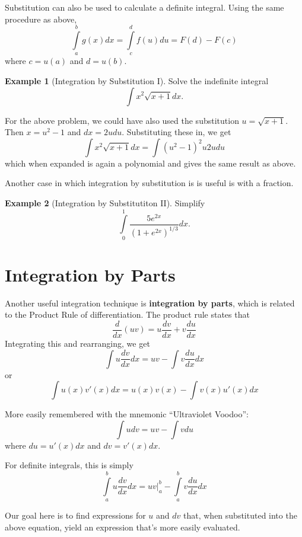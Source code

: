 \documentclass[
]{book}
\theoremstyle{definition}
\theoremstyle{definition}
\newtheorem{example}{Example}[chapter]
\theoremstyle{definition}
\theoremstyle{definition}
\theoremstyle{remark}
\begin{document}
Substitution can also be used to calculate a definite integral. Using the same procedure as above, \[\int\limits_a^b g(x)dx=\int\limits_c^d f(u)du = F(d)-F(c)\]
where \(c=u(a)\) and \(d=u(b)\).

\begin{example}[Integration by Substitution I]
\protect\hypertarget{exm:intsub1}{}{\label{exm:intsub1} {} }
Solve the indefinite integral \[\int x^2 \sqrt{x+1}dx.\]
\end{example}

For the above problem, we could have also used the substitution \(u=\sqrt{x+1}\). Then \(x=u^2-1\) and \(dx=2u du\). Substituting these in, we get \[\int x^2\sqrt{x+1}dx=\int (u^2-1)^2 u 2u du\] which when expanded is again a polynomial and gives the same result as above.

Another case in which integration by substitution is is useful is with a fraction.

\begin{example}[Integration by Substitutiton II]
\protect\hypertarget{exm:intsub2}{}{\label{exm:intsub2} {} }Simplify \[\int\limits_0^1 \frac{5e^{2x}}{(1+e^{2x})^{1/3}}dx.\]
\end{example}

\hypertarget{integration-by-parts}{%
\section{Integration by Parts}\label{integration-by-parts}}

Another useful integration technique is \textbf{integration by parts}, which is related to the Product Rule of differentiation. The product rule states that \[\frac{d}{dx}(uv)=u\frac{dv}{dx}+v\frac{du}{dx}\] Integrating this and rearranging, we get \[\int u\frac{dv}{dx}dx= u v - \int v \frac{du}{dx}dx\] or \[\int u(x) v'(x)dx=u(x)v(x) - \int v(x)u'(x)dx\]

More easily remembered with the mnemonic ``Ultraviolet Voodoo'': \[\int u dv = u v - \int v du\] where \(du=u'(x)dx\) and \(dv=v'(x)dx\).

For definite integrals, this is simply
\[\int\limits_a^b u\frac{dv}{dx}dx = \left. u v \right|_a^b - \int\limits_a^b v \frac{du}{dx}dx\]

Our goal here is to find expressions for \(u\) and \(dv\) that, when substituted into the above equation, yield an expression that's more easily evaluated.
\end{document}
